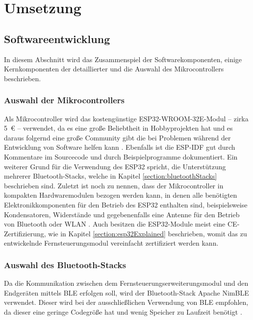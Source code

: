 
\chapter{Umsetzung}

\section{Softwareentwicklung}
In diesem Abschnitt wird das Zusammenspiel der Softwarekomponenten, einige Kernkomponenten der  detaillierter und die Auswahl des Mikrocontrollers beschrieben.

\subsection{Auswahl der Mikrocontrollers}
Als Mikrocontroller wird das kostengünstige ESP32-WROOM-32E-Modul -- zirka 5~€ \cite{espressifModules} -- verwendet, da es eine große Beliebtheit in Hobbyprojekten hat und es daraus folgernd eine große Community gibt die bei Problemen während der Entwicklung von Software helfen kann \cites{redditESP32}{esp32Forum}. Ebenfalls ist die \ac{ESP-IDF} gut durch Kommentare im Sourcecode und durch Beispielprogramme dokumentiert. Ein weiterer Grund für die Verwendung des ESP32 spricht, die Unterstützung mehrerer Bluetooth-Stacks, welche in Kapitel \ref{section:bluetoothStacks} beschrieben sind. Zuletzt ist noch zu nennen, dass der Mikrocontroller in kompakten Hardwaremodulen bezogen werden kann, in denen alle benötigten Elektronikkomponenten für den Betrieb des ESP32 enthalten sind, beispielsweise Kondensatoren, Widerstände und gegebenenfalls eine Antenne für den Betrieb von Bluetooth oder \acs{WLAN} \cite[S.~14]{espressifHardwareDesignGuidelines}. Auch besitzen die ESP32-Module meist eine CE-Zertifizierung, wie in Kapitel \ref{section:esp32Explained} beschrieben, womit das zu entwickelnde Fernsteuerungsmodul vereinfacht zertifiziert werden kann.

\subsection{Auswahl des Bluetooth-Stacks}

Da die Kommunikation zwischen dem Fernsteuerungserweiterungsmodul und den Endgeräten mittels \ac{BLE} erfolgen soll, wird der Bluetooth-Stack Apache NimBLE verwendet. Dieser wird bei der ausschließlichen Verwendung von \ac{BLE} empfohlen, da dieser eine geringe Codegröße hat und wenig Speicher zu Laufzeit benötigt \cite{espidfBluetoothStack}.

